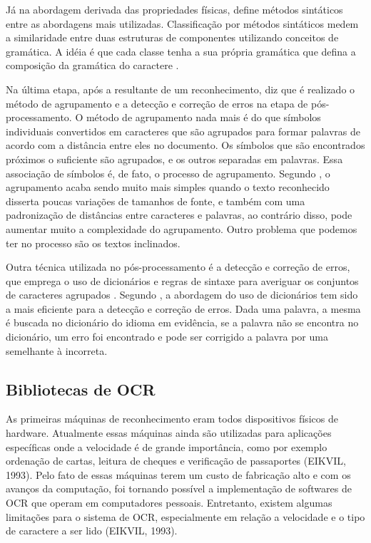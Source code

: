 Já na abordagem derivada das propriedades físicas,  define métodos sintáticos entre as abordagens mais utilizadas. Classificação por métodos sintáticos medem a similaridade entre duas estruturas de componentes utilizando conceitos de gramática. A idéia é que cada classe tenha a sua própria gramática que defina a composição da gramática do caractere \cite{ANDRADE2016}. 




Na última etapa, após a resultante de um reconhecimento,  diz que é realizado o método de agrupamento e a detecção e correção de erros na etapa de pós-processamento. O método de agrupamento nada mais é do que símbolos individuais convertidos em caracteres que são agrupados para formar palavras de acordo com a distância entre eles no documento. Os símbolos que são encontrados próximos o suficiente são agrupados, e os outros separadas em palavras. Essa associação de símbolos é, de fato, o processo de agrupamento. Segundo , o agrupamento acaba sendo muito mais simples quando o texto reconhecido disserta poucas variações de tamanhos de fonte, e também com uma padronização de distâncias entre caracteres e palavras, ao contrário disso, pode aumentar muito a complexidade do agrupamento. Outro problema que podemos ter no processo são os textos inclinados.


Outra técnica utilizada no pós-processamento é a detecção e correção de erros, que emprega o uso de dicionários e regras de sintaxe para averiguar os conjuntos de caracteres agrupados \cite{Eikvil1993}. Segundo , a abordagem do uso de dicionários tem sido a mais eficiente para a detecção e correção de erros. Dada uma palavra, a mesma é buscada no dicionário do idioma em evidência, se a palavra não se encontra no dicionário, um erro foi encontrado e pode ser corrigido a palavra por uma semelhante à incorreta.



\subsection{Bibliotecas de OCR}

As primeiras máquinas de reconhecimento eram todos dispositivos físicos de hardware. Atualmente essas máquinas ainda são utilizadas para aplicações específicas onde a velocidade é de grande importância, como por exemplo ordenação de cartas, leitura de cheques e verificação de passaportes (EIKVIL, 1993). Pelo fato de essas máquinas terem um custo de fabricação alto e com os avanços da computação, foi tornando possível a implementação de softwares de OCR que operam em computadores pessoais. Entretanto, existem algumas limitações para o sistema de OCR, especialmente em relação a velocidade e o tipo de caractere a ser lido (EIKVIL, 1993). 

